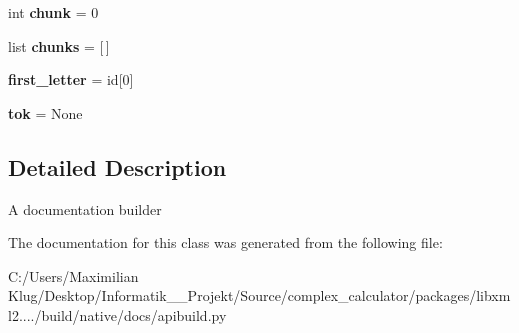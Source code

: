 \begin{DoxyCompactItemize}
int {\bfseries chunk} = 0
\item 
\mbox{\label{classapibuild_1_1doc_builder_a096072bda74683b9baa6f8197b12cdfe}} 
list {\bfseries chunks} = \mbox{[}$\,$\mbox{]}
\item 
\mbox{\label{classapibuild_1_1doc_builder_aec653c1a3b72c67615d446220e5dd818}} 
{\bfseries first\+\_\+letter} = id\mbox{[}0\mbox{]}
\item 
\mbox{\label{classapibuild_1_1doc_builder_a4c8586c402ae7f31c21373bb96fbe028}} 
{\bfseries tok} = None
\end{DoxyCompactItemize}


\subsection{Detailed Description}
\begin{DoxyVerb}A documentation builder\end{DoxyVerb}
 

The documentation for this class was generated from the following file\+:\begin{DoxyCompactItemize}
\item 
C\+:/\+Users/\+Maximilian Klug/\+Desktop/\+Informatik\+\_\+\_\+\+Projekt/\+Source/complex\+\_\+calculator/packages/libxml2..../build/native/docs/apibuild.\+py\end{DoxyCompactItemize}
